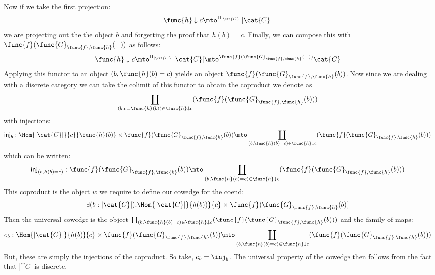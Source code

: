 Now if we take the first projection:
\[
    \func{h} \downarrow c \mto^{\Pi_{|\cat{C}|}} |\cat{C}|
\]
we are projecting out the the object $b$ and forgetting the proof
that $h(b) = c$.  Finally, we can compose this with
$\func{f}(\func{G}_{\func{f},\func{h}}(-))$ as follows:
\[
    \func{h} \downarrow c \mto^{\Pi_{|\cat{C}|}} |\cat{C}| \mto^{\func{f}(\func{G}_{\func{f},\func{h}}(-))} \cat{C}
\]
Applying this functor to an object $(b, \func{h}(b) = c)$ yields an
object $\func{f}(\func{G}_{\func{f},\func{h}}(b))$.  Now since we are
dealing with a discrete category we can take the colimit of this
functor to obtain the coproduct we denote as 
\[
   \coprod_{(b,c = \func{h}(b)) \in \func{h} \downarrow c}(\func{f}(\func{G}_{\func{f},\func{h}}(b)))
\]
with injections:
\[
    \mathsf{inj}_b : \Hom{|\cat{C}|}{c}{\func{h}(b)} \times \func{f}(\func{G}_{\func{f},\func{h}}(b)) \mto \coprod_{(b,\func{h}(b) = c) \in \func{h} \downarrow c}(\func{f}(\func{G}_{\func{f},\func{h}}(b)))
\]
which can be written:
\[
    \mathsf{inj}_{(b,h(b) = c)} : \func{f}(\func{G}_{\func{f},\func{h}}(b)) \mto \coprod_{(b,\func{h}(b) = c) \in \func{h} \downarrow c}(\func{f}(\func{G}_{\func{f},\func{h}}(b)))
\]
This coproduct is the object $w$ we require to define our cowedge for
the coend:
\[
    \exists(b : |\cat{C}|).\Hom{|\cat{C}|}{h(b))}{c} \times \func{f}(\func{G}_{\func{f},\func{h}}(b))
\]
Then the universal cowedge is the object $\coprod_{(b,\func{h}(b) = c)
\in \func{h} \downarrow c}(\func{f}(\func{G}_{\func{f},\func{h}}(b)))$
and the family of maps:
\[
    e_b : \Hom{|\cat{C}|}{h(b)}{c} \times \func{f}(\func{G}_{\func{f},\func{h}}(b)) \mto 
    \coprod_{(b,\func{h}(b) = c) \in \func{h} \downarrow c}(\func{f}(\func{G}_{\func{f},\func{h}}(b)))
\]
But, these are simply the injections of the coproduct.  So take, $e_b
= \inj_{b}$.  The universal property of the cowedge then follows from
the fact that $|\cat{C}|$ is discrete. 

